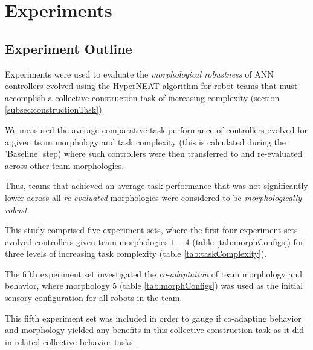 \chapter{Experiments}
\label{Chapter4}




\section{Experiment Outline} \label{sec:experiment_outline}

Experiments were used to evaluate the \textit{morphological robustness} of ANN controllers evolved using the HyperNEAT algorithm for
robot teams that must accomplish a collective construction task of increasing
complexity (section \ref{subsec:constructionTask}).

We measured the average comparative task performance of controllers evolved
for a given team morphology and task complexity (this is calculated during the 'Baseline' step) where such controllers were
then transferred to
and re-evaluated across other team morphologies.

Thus, teams that achieved an average task performance that was not significantly lower
across all \textit{re-evaluated} morphologies were considered to be \textit{morphologically robust}.

This study comprised five experiment sets, where the first four experiment sets evolved
controllers given team morphologies $1-4$ (table \ref{tab:morphConfigs})
for three levels of increasing task complexity (table \ref{tab:taskComplexity}).

The fifth experiment set investigated the \textit{co-adaptation} of team morphology
and behavior, where morphology $5$ (table \ref{tab:morphConfigs}) was used
as the initial sensory configuration for all robots in the team.

This fifth experiment set was included in order to gauge if co-adapting behavior
and morphology yielded any benefits in this collective construction task as it did in related
collective behavior tasks \cite{HewlandNitschke2015}.


